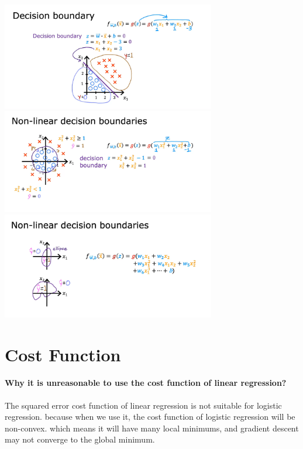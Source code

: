 \begin{center}
    \includegraphics[width=0.7\textwidth]{images/6.1_3 (2)}\\
    \includegraphics[width=0.7\textwidth]{images/6.1_3 (1)}\\
    \includegraphics[width=0.7\textwidth]{images/6.1_3 (3)}
\end{center}
 
\section{Cost Function}
\paragraph*{Why it is unreasonable to use the cost function of linear regression?}\leavevmode

The squared error cost function of linear regression is not suitable for logistic regression.
because when we use it, the cost function of logistic regression will be non-convex.
which means it will have many local minimums, and gradient descent may not converge to the global minimum.\par

